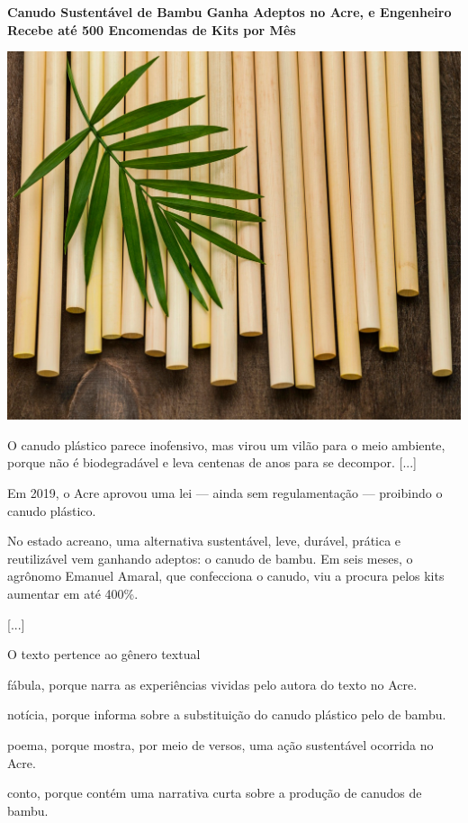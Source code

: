 \begin{myquote}
\textbf{Canudo Sustentável de Bambu Ganha Adeptos no Acre, e Engenheiro
Recebe até 500 Encomendas de Kits por Mês}

\begin{center}
\noindent\includegraphics[width=.4\textwidth]{media/image20c.jpg}
\end{center}

O canudo plástico parece inofensivo, mas virou um vilão para o meio
ambiente, porque não é biodegradável e leva centenas de anos para se
decompor. {[}...{]}

Em 2019, o Acre aprovou uma lei --- ainda sem regulamentação ---
proibindo o canudo plástico.

No estado acreano, uma alternativa sustentável, leve, durável, prática e
reutilizável vem ganhando adeptos: o canudo de bambu. Em seis meses, o
agrônomo Emanuel Amaral, que confecciona o canudo, viu a procura pelos
kits aumentar em até 400\%.

{[}...{]}

\end{myquote} 

O texto pertence ao gênero textual

\begin{escolha}
\item fábula, porque narra as experiências vividas pelo autora do texto no Acre.

\item notícia, porque informa sobre a substituição do canudo plástico pelo de bambu.

\item poema, porque mostra, por meio de versos, uma ação sustentável ocorrida no Acre.

\item conto, porque contém uma narrativa curta sobre a produção de canudos de bambu.
\end{escolha}


